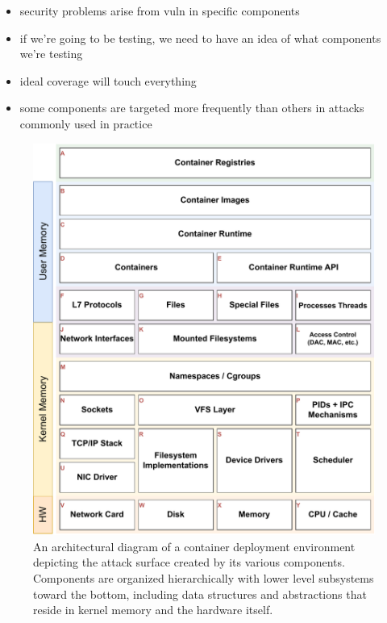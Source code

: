 
\begin{itemize}
\item security problems arise from vuln in specific components
\item if we're going to be testing, we need to have an idea of what components we're testing
\item ideal coverage will touch everything
\item some components are targeted more frequently than others in attacks commonly used in practice
\end{itemize}

\begin{figure}
  \label{fig:architecture}
  \includegraphics[width=1\linewidth]{figs/exploit-coverage.pdf}
  \caption{An architectural diagram of a container deployment environment depicting the
  attack surface created by its various components. Components are organized
  hierarchically with lower level subsystems toward the bottom, including data structures
  and abstractions that reside in kernel memory and the hardware itself.}
\end{figure}
